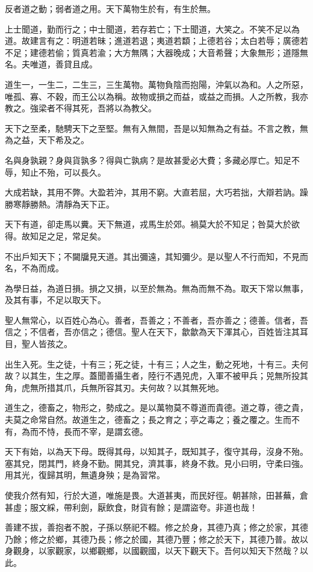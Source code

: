 \begin{pinyinscope}
反者道之動；弱者道之用。天下萬物生於有，有生於無。

上士聞道，勤而行之；中士聞道，若存若亡；下士聞道，大笑之。不笑不足以為道。故建言有之：明道若昧；進道若退；夷道若纇；上德若谷；太白若辱；廣德若不足；建德若偷；質真若渝；大方無隅；大器晚成；大音希聲；大象無形；道隱無名。夫唯道，善貸且成。

道生一，一生二，二生三，三生萬物。萬物負陰而抱陽，沖氣以為和。人之所惡，唯孤、寡、不穀，而王公以為稱。故物或損之而益，或益之而損。人之所教，我亦教之。強梁者不得其死，吾將以為教父。

天下之至柔，馳騁天下之至堅。無有入無間，吾是以知無為之有益。不言之教，無為之益，天下希及之。

名與身孰親？身與貨孰多？得與亡孰病？是故甚愛必大費；多藏必厚亡。知足不辱，知止不殆，可以長久。

大成若缺，其用不弊。大盈若沖，其用不窮。大直若屈，大巧若拙，大辯若訥。躁勝寒靜勝熱。清靜為天下正。

天下有道，卻走馬以糞。天下無道，戎馬生於郊。禍莫大於不知足；咎莫大於欲得。故知足之足，常足矣。

不出戶知天下；不闚牖見天道。其出彌遠，其知彌少。是以聖人不行而知，不見而名，不為而成。

為學日益，為道日損。損之又損，以至於無為。無為而無不為。取天下常以無事，及其有事，不足以取天下。

聖人無常心，以百姓心為心。善者，吾善之；不善者，吾亦善之；德善。信者，吾信之；不信者，吾亦信之；德信。聖人在天下，歙歙為天下渾其心，百姓皆注其耳目，聖人皆孩之。

出生入死。生之徒，十有三；死之徒，十有三；人之生，動之死地，十有三。夫何故？以其生，生之厚。蓋聞善攝生者，陸行不遇兕虎，入軍不被甲兵；兕無所投其角，虎無所措其爪，兵無所容其刃。夫何故？以其無死地。

道生之，德畜之，物形之，勢成之。是以萬物莫不尊道而貴德。道之尊，德之貴，夫莫之命常自然。故道生之，德畜之；長之育之；亭之毒之；養之覆之。生而不有，為而不恃，長而不宰，是謂玄德。

天下有始，以為天下母。既得其母，以知其子，既知其子，復守其母，沒身不殆。塞其兌，閉其門，終身不勤。開其兌，濟其事，終身不救。見小曰明，守柔曰強。用其光，復歸其明，無遺身殃；是為習常。

使我介然有知，行於大道，唯施是畏。大道甚夷，而民好徑。朝甚除，田甚蕪，倉甚虛；服文綵，帶利劍，厭飲食，財貨有餘；是謂盜夸。非道也哉！

善建不拔，善抱者不脫，子孫以祭祀不輟。修之於身，其德乃真；修之於家，其德乃餘；修之於鄉，其德乃長；修之於國，其德乃豐；修之於天下，其德乃普。故以身觀身，以家觀家，以鄉觀鄉，以國觀國，以天下觀天下。吾何以知天下然哉？以此。


\end{pinyinscope}
